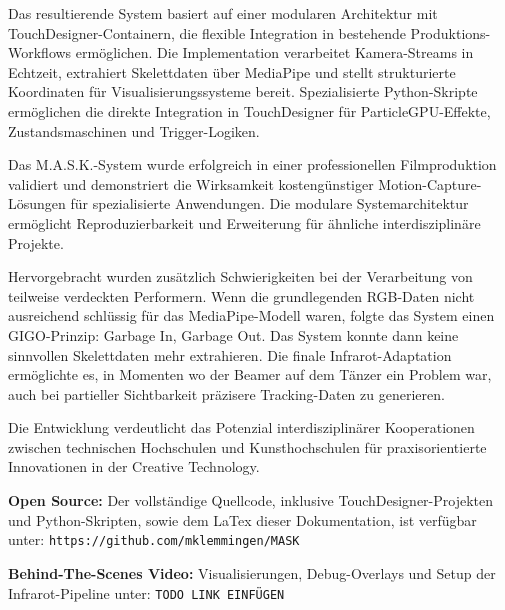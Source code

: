 Das resultierende System basiert auf einer modularen Architektur mit TouchDesigner-Containern, die flexible Integration in bestehende Produktions-Workflows ermöglichen. Die Implementation verarbeitet Kamera-Streams in Echtzeit, extrahiert Skelettdaten über MediaPipe und stellt strukturierte Koordinaten für Visualisierungssysteme bereit. Spezialisierte Python-Skripte ermöglichen die direkte Integration in TouchDesigner für ParticleGPU-Effekte, Zustandsmaschinen und Trigger-Logiken.

Das M.A.S.K.-System wurde erfolgreich in einer professionellen Filmproduktion validiert und demonstriert die Wirksamkeit kostengünstiger Motion-Capture-Lösungen für spezialisierte Anwendungen. Die modulare Systemarchitektur ermöglicht Reproduzierbarkeit und Erweiterung für ähnliche interdisziplinäre Projekte.

Hervorgebracht wurden zusätzlich Schwierigkeiten bei der Verarbeitung von teilweise verdeckten Performern. Wenn die grundlegenden RGB-Daten nicht ausreichend schlüssig für das MediaPipe-Modell waren, folgte das System einen GIGO-Prinzip: Garbage In, Garbage Out. Das System konnte dann keine sinnvollen Skelettdaten mehr extrahieren. Die finale Infrarot-Adaptation ermöglichte es, in Momenten wo der Beamer auf dem Tänzer ein Problem war, auch bei partieller Sichtbarkeit präzisere Tracking-Daten zu generieren.

Die Entwicklung verdeutlicht das Potenzial interdisziplinärer Kooperationen zwischen technischen Hochschulen und Kunsthochschulen für praxisorientierte Innovationen in der Creative Technology.

\textbf{Open Source:} Der vollständige Quellcode, inklusive TouchDesigner-Projekten und Python-Skripten, sowie dem LaTex dieser Dokumentation, ist verfügbar unter: \texttt{https://github.com/mklemmingen/MASK}

\textbf{Behind-The-Scenes Video:} Visualisierungen, Debug-Overlays und Setup der Infrarot-Pipeline unter: \texttt{TODO LINK EINFÜGEN}